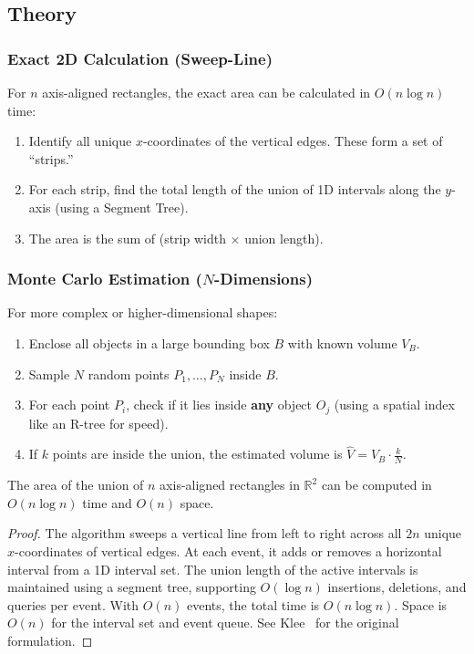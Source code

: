 \subsection{Theory}

\subsubsection*{Exact 2D Calculation (Sweep-Line)}
For $n$ axis-aligned rectangles, the exact area can be calculated in $O(n \log n)$ time:
\begin{enumerate}
    \item Identify all unique $x$-coordinates of the vertical edges. These form a set of ``strips.''
    \item For each strip, find the total length of the union of 1D intervals along the $y$-axis (using a Segment Tree).
    \item The area is the sum of (strip width $\times$ union length).
\end{enumerate}

\subsubsection*{Monte Carlo Estimation ($N$-Dimensions)}
For more complex or higher-dimensional shapes:
\begin{enumerate}
    \item Enclose all objects in a large bounding box $B$ with known volume $V_B$.
    \item Sample $N$ random points $P_1, \dots, P_N$ inside $B$.
    \item For each point $P_i$, check if it lies inside \textbf{any} object $O_j$ (using a spatial index like an R-tree for speed).
    \item If $k$ points are inside the union, the estimated volume is $\hat{V} = V_B \cdot \frac{k}{N}$.
\end{enumerate}

\begin{theorem}\label{thm:sweep_union}
The area of the union of $n$ axis-aligned rectangles in $\mathbb{R}^2$ can be computed in $O(n \log n)$ time and $O(n)$ space.
\end{theorem}

\begin{proof}
The algorithm sweeps a vertical line from left to right across all $2n$ unique $x$-coordinates of vertical edges. At each event, it adds or removes a horizontal interval from a 1D interval set. The union length of the active intervals is maintained using a segment tree, supporting $O(\log n)$ insertions, deletions, and queries per event. With $O(n)$ events, the total time is $O(n \log n)$. Space is $O(n)$ for the interval set and event queue. See Klee~\cite{klee1977} for the original formulation.
\end{proof}

